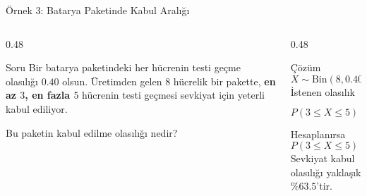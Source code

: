 \documentclass[light]{lutbeamer}
\begin{document}
\begin{frame}{Örnek 3: Batarya Paketinde Kabul Aralığı}
    \scriptsize
    \begin{columns}[T,onlytextwidth]
        \begin{column}{0.48\textwidth}
            \begin{block}{Soru}
                Bir batarya paketindeki her hücrenin testi geçme olasılığı \(0.40\) olsun.
                Üretimden gelen \(8\) hücrelik bir pakette,
                \textbf{en az \(3\), en fazla \(5\)} hücrenin testi geçmesi
                sevkiyat için yeterli kabul ediliyor.

                Bu paketin kabul edilme olasılığı nedir?
            \end{block}
        \end{column}
        \begin{column}{0.48\textwidth}
            \begin{exampleblock}{Çözüm}
                \[
                X\sim \mathrm{Bin}(8,0.40)
                \]
                İstenen olasılık
                \[
                P(3\le X\le 5)=\sum_{x=3}^{5}\binom{8}{x}(0.40)^x(0.60)^{8-x}.
                \]
                Hesaplanırsa
                \[
                P(3\le X\le 5)\approx 0.6348.
                \]
                Sevkiyat kabul olasılığı yaklaşık \(\%63.5\)'tir.
            \end{exampleblock}
        \end{column}
    \end{columns}
\end{frame}
\end{document}
